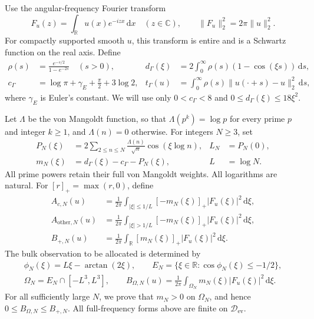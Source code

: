 \documentclass[11pt]{article}
\theoremstyle{remark}
\newcommand{\R}{\mathbb R}
\newcommand{\C}{\mathbb C}
\newcommand{\dd}{\,\mathrm d}
\newcommand{\norm}[1]{\lVert #1\rVert}
\newcommand{\core}{\mathcal D_{\mathrm{ev}}}
\numberwithin{equation}{section}
\begin{document}
Use the angular-frequency Fourier transform
\begin{equation}\label{eq:fourier}
 F_u(z)=\int_\R u(x)e^{-izx}\dd x\quad(z\in\C),
 \qquad \norm{F_u}_2^2=2\pi\norm{u}_2^2.
\end{equation}
For compactly supported smooth $u$, this transform is entire and is a Schwartz function on the real axis. Define
\begin{align}
 \rho(s)&=\frac{e^{-s/2}}{1-e^{-2s}}\quad(s>0),&
 d_\Gamma(\xi)&=2\int_0^\infty\rho(s)(1-\cos(\xi s))\dd s,\label{eq:gamma}\\
 c_\Gamma&=\log\pi+\gamma_E+\frac\pi2+3\log2,&
 t_\Gamma(u)&=\int_0^\infty\rho(s)\norm{u(\cdot+s)-u}_2^2\dd s,\label{eq:gammaform}
\end{align}
where $\gamma_E$ is Euler's constant. We will use only
$0<c_\Gamma<8$ and $0\le d_\Gamma(\xi)\le18\xi^2$.

Let $\Lambda$ be the von Mangoldt function, so that $\Lambda(p^k)=\log p$ for every prime $p$ and integer $k\ge1$, and $\Lambda(n)=0$ otherwise. For integers $N\ge3$, set
\begin{align}
 P_N(\xi)&=2\sum_{2\le n\le N}\frac{\Lambda(n)}{\sqrt n}\cos(\xi\log n),&
 L_N&=P_N(0),\label{eq:prime}\\
 m_N(\xi)&=d_\Gamma(\xi)-c_\Gamma-P_N(\xi),&
 L&=\log N.\label{eq:multiplier}
\end{align}
All prime powers retain their full von Mangoldt weights. All logarithms are natural. For $[r]_+=\max(r,0)$, define
\begin{align}
 A_{c,N}(u)&=\frac1{2\pi}\int_{|\xi|\le1/L}[-m_N(\xi)]_+|F_u(\xi)|^2\dd\xi,\label{eq:central}\\
 A_{\mathrm{other},N}(u)&=\frac1{2\pi}\int_{|\xi|>1/L}[-m_N(\xi)]_+|F_u(\xi)|^2\dd\xi,\label{eq:other}\\
 B_{+,N}(u)&=\frac1{2\pi}\int_\R[m_N(\xi)]_+|F_u(\xi)|^2\dd\xi.\label{eq:positivepart}
\end{align}
The bulk observation to be allocated is determined by
\begin{gather}
 \phi_N(\xi)=L\xi-\arctan(2\xi),\qquad
 E_N=\{\xi\in\R:\cos\phi_N(\xi)\le-1/2\},\label{eq:phase}\\
 \Omega_N=E_N\cap[-L^3,L^3],\qquad
 B_{\Omega,N}(u)=\frac1{2\pi}\int_{\Omega_N}m_N(\xi)|F_u(\xi)|^2\dd\xi.\label{eq:bulk}
\end{gather}
For all sufficiently large $N$, we prove that $m_N>0$ on $\Omega_N$, and hence $0\le B_{\Omega,N}\le B_{+,N}$. All full-frequency forms above are finite on $\core$.
\end{document}
